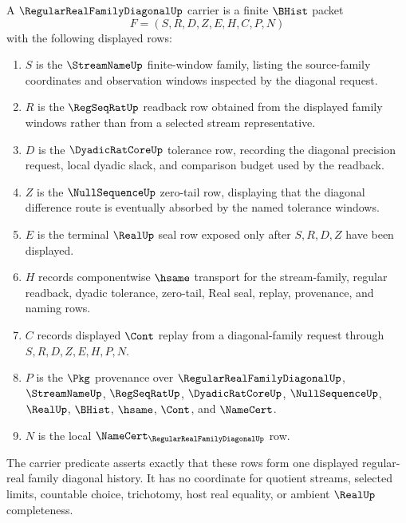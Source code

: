 \begin{definition}
\label{def:regular-real-family-diagonal-carrier}
A $\RegularRealFamilyDiagonalUp$ carrier is a finite $\BHist$ packet
$$
F=(S,R,D,Z,E,H,C,P,N)
$$
with the following displayed rows:
\begin{enumerate}
\item $S$ is the $\StreamNameUp$ finite-window family, listing the source-family coordinates and observation windows inspected by the diagonal request.
\item $R$ is the $\RegSeqRatUp$ readback row obtained from the displayed family windows rather than from a selected stream representative.
\item $D$ is the $\DyadicRatCoreUp$ tolerance row, recording the diagonal precision request, local dyadic slack, and comparison budget used by the readback.
\item $Z$ is the $\NullSequenceUp$ zero-tail row, displaying that the diagonal difference route is eventually absorbed by the named tolerance windows.
\item $E$ is the terminal $\RealUp$ seal row exposed only after $S,R,D,Z$ have been displayed.
\item $H$ records componentwise $\hsame$ transport for the stream-family, regular readback, dyadic tolerance, zero-tail, Real seal, replay, provenance, and naming rows.
\item $C$ records displayed $\Cont$ replay from a diagonal-family request through $S,R,D,Z,E,H,P,N$.
\item $P$ is the $\Pkg$ provenance over $\RegularRealFamilyDiagonalUp$, $\StreamNameUp$, $\RegSeqRatUp$, $\DyadicRatCoreUp$, $\NullSequenceUp$, $\RealUp$, $\BHist$, $\hsame$, $\Cont$, and $\NameCert$.
\item $N$ is the local $\NameCert_{\RegularRealFamilyDiagonalUp}$ row.
\end{enumerate}
The carrier predicate asserts exactly that these rows form one displayed regular-real family diagonal history. It has no coordinate for quotient streams, selected limits, countable choice, trichotomy, host real equality, or ambient $\RealUp$ completeness.
\end{definition}

